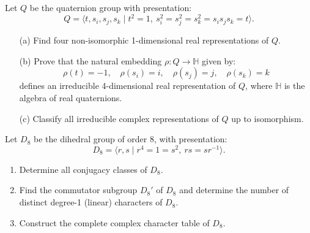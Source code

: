\begin{prob}[S2012-Q4]
    Let \( Q \) be the quaternion group with presentation:
\[
Q = \langle t, s_i, s_j, s_k \mid t^2 = 1,\ s_i^2 = s_j^2 = s_k^2 = s_i s_j s_k = t \rangle.
\]

\begin{enumerate}
    \item[(a)] Find four non-isomorphic 1-dimensional real representations of \( Q \).
    
    \item[(b)] Prove that the natural embedding \( \rho \colon Q \to \mathbb{H} \) given by:
    \[
    \rho(t) = -1, \quad \rho(s_i) = i, \quad \rho(s_j) = j, \quad \rho(s_k) = k
    \]
    defines an irreducible 4-dimensional real representation of \( Q \), where \( \mathbb{H} \) is the algebra of real quaternions.
    
    \item[(c)] Classify all irreducible complex representations of \( Q \) up to isomorphism.
\end{enumerate}
\end{prob}

\begin{prob}[F2004-Q6]
    Let \( D_8 \) be the dihedral group of order 8, with presentation:
    \[
    D_8 = \langle r, s \mid r^4 = 1 = s^2,\ rs = sr^{-1} \rangle.
    \]
    
    \begin{enumerate}
        \item Determine all conjugacy classes of \( D_8 \).
        
        \item Find the commutator subgroup \( D_8' \) of \( D_8 \) and determine the number of distinct degree-1 (linear) characters of \( D_8 \).
        
        \item Construct the complete complex character table of \( D_8 \).
    \end{enumerate}
\end{prob}


